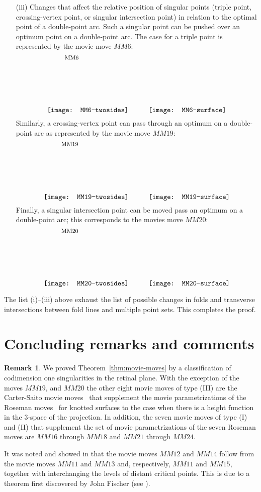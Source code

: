 \documentclass{amsart}\usepackage{amsfonts, amsmath, amssymb}\usepackage{graphicx, epic, epsf, enumerate, stmaryrd}
\theoremstyle{definition}
\newtheorem{remark}{Remark}
\numberwithin{equation}{section}
\begin{document}
\begin{enumerate}
\item[(iii)] Changes that affect the relative position of singular points (triple point, crossing-vertex point, or singular intersection point) in relation to the optimal point of a double-point arc.  Such a singular point can be pushed over an optimum point on a double-point arc.
The case for a triple point is represented by the movie move $MM6$:
 \[ \put(25, 75){\fontsize{8}{8}$\text{MM6}$} 
 \raisebox{0pt}{\texttt{[image: MM6-twosides]}}
 \hspace{1cm} \raisebox{0pt}{\texttt{[image: MM6-surface]}}
 \]
Similarly, a crossing-vertex point can pass through an optimum on a double-point arc as represented by the movie move $MM19$:
 \[ \put(25, 75){\fontsize{8}{8}$\text{MM19}$} 
 \raisebox{0pt}{\texttt{[image: MM19-twosides]}}
 \hspace{1cm} \raisebox{0pt}{\texttt{[image: MM19-surface]}}
 \]
Finally, a singular intersection point can be moved pass an optimum on a double-point arc; this corresponds to the movies move $MM20$:
 \[ \put(25, 75){\fontsize{8}{8}$\text{MM20}$} 
 \raisebox{0pt}{\texttt{[image: MM20-twosides]}}
 \hspace{1cm} \raisebox{0pt}{\texttt{[image: MM20-surface]}}
 \]

\end{enumerate}
The list (i)--(iii) above exhaust the list of possible changes in folds and transverse intersections between fold lines and multiple point sets. This completes the proof.

\section{Concluding remarks and comments} \label{sec:remarks}

\begin{remark}
We proved Theorem~\ref{thm:movie-moves} by a classification of codimension one singularities in the retinal plane. With the exception of the moves $MM19$, and $MM20$ the other eight movie moves of type (III) are the Carter-Saito movie moves~\cite{CS} that supplement the movie parametrizations of the Roseman moves~\cite{Ros} for knotted surfaces to the case when there is a height function in the 3-space of the projection. In addition, the seven movie moves of type (I) and (II) that supplement the set of movie parametrizations of the seven Roseman moves are $MM16$ through $MM18$ and $MM21$ through $MM24$.

It was noted and showed in \cite{Ca0} that the movie moves $MM12$ and $MM14$ follow from the movie moves $MM11$ and $MM13$ and, respectively, $MM11$ and $MM15$, together with interchanging the levels of distant critical points. This is due to a theorem first discovered by John Fischer (see \cite[Figure 6.17]{Ca0}).
\end{remark}
\end{document}
